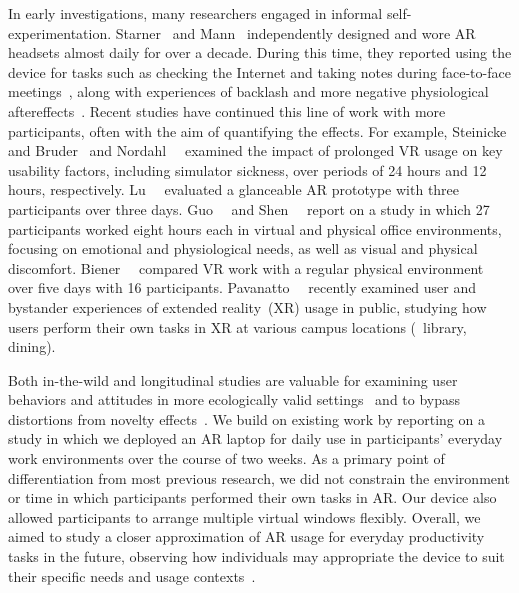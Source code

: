 In early investigations, many researchers engaged in informal self-experimentation. 
Starner~\cite{stevens2013starner}
and Mann~\cite{buchanan2013mann}
independently designed and wore AR headsets almost daily for over a decade.
During this time, 
they reported using the device for tasks such as checking the Internet and taking notes during face-to-face meetings~\cite{stevens2013starner},
along with experiences of backlash and more negative physiological aftereffects~\cite{buchanan2013mann}. 
Recent studies have continued this line of work with more participants, often with the aim of quantifying the effects.
For example, Steinicke and Bruder~\cite{steinicke2014selfexperimentation}
and Nordahl~\etal~\cite{nordahl2019hours} examined the impact of prolonged VR usage on key usability factors, including simulator sickness, over periods of 24 hours and 12 hours, respectively.
Lu~\etal~\cite{lu2023inthewild} evaluated a glanceable AR prototype with three participants over three days.
Guo~\etal~\cite{guo2019maslows}
and Shen~\etal~\cite{shen2019longtermfatigue} 
report on a study in which 27 participants worked eight hours each in virtual and physical office environments, focusing on emotional and physiological needs, as well as visual and physical discomfort.
Biener~\etal~\cite{biener2022vrweek,biener2024holdtight} compared VR work with a regular physical environment over five days with 16 participants. 
Pavanatto~\etal~\cite{pavanatto2024xrwild} recently examined user and bystander experiences of extended reality~(XR) usage in public, studying how users perform their own tasks in XR at various campus locations (\eg~library, dining).

Both in-the-wild and longitudinal studies are valuable for examining user behaviors and attitudes in more ecologically valid settings~\cite{abowd2000chartingubicomp} and to bypass distortions from novelty effects~\cite{bailenson2024seeing}.
We build on existing work by reporting on a study in which we deployed an AR laptop for daily use in participants' everyday work environments over the course of two weeks. 
As a primary point of differentiation from most previous research,
we did not constrain the environment or time in which participants performed their own tasks in AR. 
Our device also allowed participants to arrange multiple virtual windows flexibly. 
Overall, we aimed to study a closer approximation of AR usage for everyday productivity tasks in the future, observing how individuals may appropriate the device to suit their specific needs and usage contexts~\cite{rogers2011wild}.
